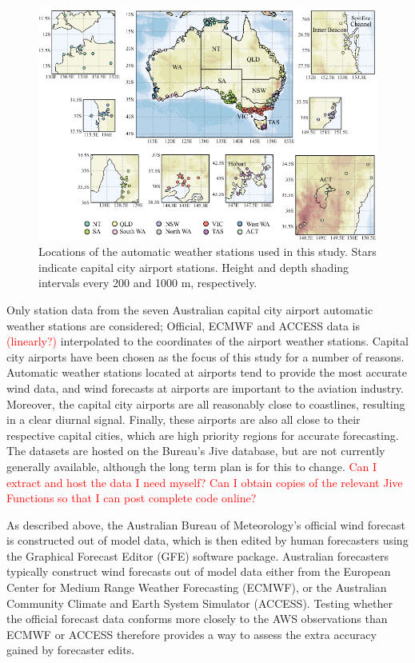 \documentclass[alpha-refs]{wiley-article}
\begin{document}
\begin{figure}
\centering
\includegraphics{map.pdf}
\caption{Locations of the automatic weather stations used in this study. Stars indicate capital city airport stations. Height and depth shading intervals every 200 and 1000 m, respectively.}
\label{Fig:map}
\end{figure}

Only station data from the seven Australian capital city airport automatic weather stations are considered; Official, ECMWF and ACCESS  data is \textcolor{red}{(linearly?)} interpolated to the coordinates of the airport weather stations. Capital city airports have been chosen as the focus of this study for a number of reasons. Automatic weather stations located at airports tend to provide the most accurate wind data, and wind forecasts at airports are important to the aviation industry. Moreover, the capital city airports are all reasonably close to coastlines, resulting in a clear diurnal signal. Finally, these airports are also all close to their respective capital cities, which are high priority regions for accurate forecasting. The datasets are hosted on the Bureau's Jive database, but are not currently generally available, although the long term plan is for this to change. \textcolor{red}{Can I extract and host the data I need myself? Can I obtain copies of the relevant Jive Functions so that I can post complete code online?}

As described above, the Australian Bureau of Meteorology's official wind forecast is constructed out of model data, which is then edited by human forecasters using the Graphical Forecast Editor (GFE) software package. Australian forecasters typically construct wind forecasts out of model data either from the European Center for Medium Range Weather Forecasting (ECMWF), or the Australian Community Climate and Earth System Simulator (ACCESS). Testing whether the official forecast data conforms more closely to the AWS observations than ECMWF or ACCESS therefore provides a way to assess the extra accuracy gained by forecaster edits.
\end{document}

